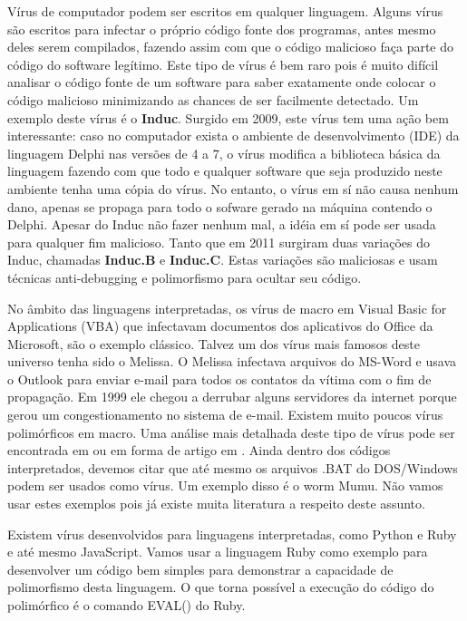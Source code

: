 Vírus de computador podem ser escritos em qualquer linguagem. Alguns vírus são escritos para infectar o próprio código fonte dos programas, antes mesmo deles serem compilados, fazendo assim com que o código malicioso faça parte do código do software legítimo. Este tipo de vírus é bem raro pois é muito difícil analisar o código fonte de um software para saber exatamente onde colocar o código malicioso minimizando as chances de ser facilmente detectado. Um exemplo deste vírus é o \textbf{Induc}\cite{symantec:4}. Surgido em 2009, este vírus tem uma ação bem interessante: caso no computador exista o ambiente de desenvolvimento (IDE) da linguagem Delphi\textsuperscript{\textregistered} nas versões de 4 a 7, o vírus modifica a biblioteca básica da linguagem fazendo com que todo e qualquer software que seja produzido neste ambiente tenha uma cópia do vírus. No entanto, o vírus em sí não causa nenhum dano, apenas se propaga para todo o sofware gerado na máquina contendo o Delphi. Apesar do Induc não fazer nenhum mal, a idéia em sí pode ser usada para qualquer fim malicioso. Tanto que em 2011 surgiram duas variações do Induc, chamadas \textbf{Induc.B} e \textbf{Induc.C}\cite{esset:1}. Estas variações são maliciosas e usam técnicas anti-debugging e polimorfismo para ocultar seu código.

No âmbito das linguagens interpretadas, os vírus de macro em Visual Basic for Applications (VBA) que infectavam documentos dos aplicativos do Office da Microsoft, são o exemplo clássico. Talvez um dos vírus mais famosos deste universo tenha sido o Melissa\cite{wiki:11}. O Melissa infectava arquivos do MS-Word e usava o Outlook para enviar e-mail para todos os contatos da vítima com o fim de propagação. Em 1999 ele chegou a derrubar alguns servidores da internet porque gerou um congestionamento no sistema de e-mail. Existem muito poucos vírus polimórficos em macro. Uma análise mais detalhada deste tipo de vírus pode ser encontrada em \cite{symantec:5,symantec:6} ou em forma de artigo em \cite{szappanos:1}. Ainda dentro dos códigos interpretados, devemos citar que até mesmo os arquivos .BAT do DOS/Windows podem ser usados como vírus. Um exemplo disso é o worm Mumu\cite{wiki:12}. Não vamos usar estes exemplos pois já existe muita literatura a respeito deste assunto. 

Existem vírus desenvolvidos para linguagens interpretadas, como Python e Ruby e até mesmo JavaScript. Vamos usar a linguagem Ruby como exemplo para desenvolver um código bem simples para demonstrar a capacidade de polimorfismo desta linguagem. O que torna possível a execução do código do polimórfico é o comando EVAL() do Ruby. 
